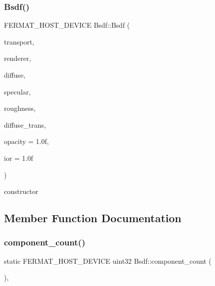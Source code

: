 \subsubsection{\texorpdfstring{Bsdf()}{Bsdf()}\hspace{0.1cm}{\footnotesize\ttfamily [4/4]}}
{\footnotesize\ttfamily F\+E\+R\+M\+A\+T\+\_\+\+H\+O\+S\+T\+\_\+\+D\+E\+V\+I\+CE Bsdf\+::\+Bsdf (\begin{DoxyParamCaption}\item[{const \hyperlink{group___b_s_d_f_module_gaca1e72535e7f260e54ed8bbf984dade9}{Transport\+Type}}]{transport,  }\item[{const \hyperlink{struct_rendering_context_view}{Rendering\+Context\+View}}]{renderer,  }\item[{const \hyperlink{structcugar_1_1_vector}{cugar\+::\+Vector3f}}]{diffuse,  }\item[{const \hyperlink{structcugar_1_1_vector}{cugar\+::\+Vector3f}}]{specular,  }\item[{const float}]{roughness,  }\item[{const \hyperlink{structcugar_1_1_vector}{cugar\+::\+Vector3f}}]{diffuse\+\_\+trans,  }\item[{const float}]{opacity = {\ttfamily 1.0f},  }\item[{const float}]{ior = {\ttfamily 1.0f} }\end{DoxyParamCaption})\hspace{0.3cm}{\ttfamily [inline]}}

constructor 

\subsection{Member Function Documentation}
\mbox{\label{struct_bsdf_a121bc781731366b8846d9a7b36eb7767}} 
\subsubsection{\texorpdfstring{component\+\_\+count()}{component\_count()}}
{\footnotesize\ttfamily static F\+E\+R\+M\+A\+T\+\_\+\+H\+O\+S\+T\+\_\+\+D\+E\+V\+I\+CE uint32 Bsdf\+::component\+\_\+count (\begin{DoxyParamCaption}{ }\end{DoxyParamCaption})\hspace{0.3cm}{\ttfamily [inline]}, {\ttfamily [static]}}

